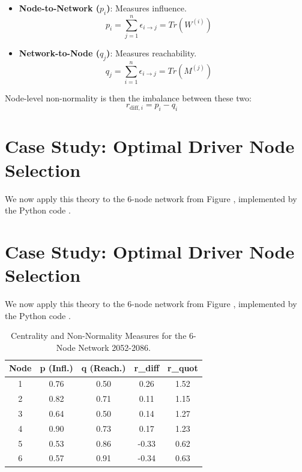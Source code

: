 \documentclass[11pt, a4paper]{article}
\begin{document}
\begin{itemize}
    \item \textbf{Node-to-Network ($p_i$)}: Measures influence.
    \begin{equation}
        p_i = \sum_{j=1}^{n} \epsilon_{i \to j} = Tr(W^{(i)}) \quad 
    \end{equation}
    \item \textbf{Network-to-Node ($q_j$)}: Measures reachability.
    \begin{equation}
        q_j = \sum_{i=1}^{n} \epsilon_{i \to j} = Tr(M^{(j)}) \quad 
    \end{equation}
\end{itemize}
Node-level non-normality is then the imbalance between these two:
\begin{equation}
    r_{\text{diff},i} = p_i - q_i \quad 
\end{equation}

\section{Case Study: Optimal Driver Node Selection}
We now apply this theory to the 6-node network from Figure , implemented by the Python code .
\section{Case Study: Optimal Driver Node Selection}
We now apply this theory to the 6-node network from Figure , implemented by the Python code .


\begin{table}[H]
    \centering
    \caption{Centrality and Non-Normality Measures for the 6-Node Network {2052-2086}.}
    \label{tab:centrality_case_study}
    \begin{tabular}{@{}ccccc@{}}
        \toprule
        \textbf{Node} & \textbf{p (Infl.)} & \textbf{q (Reach.)} & \textbf{r\_diff} & \textbf{r\_quot} \\ \midrule
        1 & 0.76 & 0.50 & 0.26 & 1.52 \\
        2 & 0.82 & 0.71 & 0.11 & 1.15 \\
        3 & 0.64 & 0.50 & 0.14 & 1.27 \\
        4 & 0.90 & 0.73 & 0.17 & 1.23 \\
        5 & 0.53 & 0.86 & -0.33 & 0.62 \\
        6 & 0.57 & 0.91 & -0.34 & 0.63 \\ \bottomrule
    \end{tabular}
\end{table}
\end{document}
